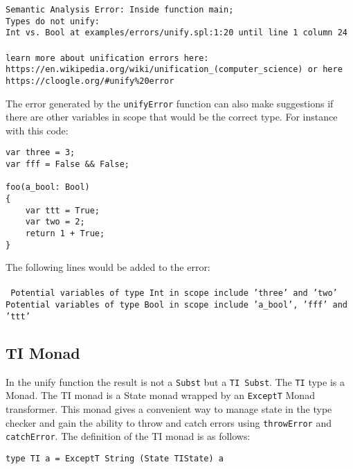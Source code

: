 \documentclass{report}
\begin{document}
\noindent\texttt{\textcolor{error}{Semantic Analysis Error:} Inside function \textcolor{name}{main};\\
Types do not unify:\\
\textcolor{type}{Int} vs. \textcolor{type}{Bool} at \textcolor{filename}{examples/errors/unify.spl:1:20} until line 1 column 24\\
\\
learn more about unification errors here:\\ https://en.wikipedia.org/wiki/unification\_(computer\_science) or here https://cloogle.org/\#unify\%20error}

\pagebreak

\noindent The error generated by the \texttt{unifyError} function can also make suggestions if there are other variables in scope that would be the correct type. For instance with this code:

\begin{lstlisting}[style=SPL]
var three = 3;
var fff = False && False;

foo(a_bool: Bool)
{ 
    var ttt = True;
    var two = 2;
    return 1 + True; 
}
\end{lstlisting}

\noindent The following lines would be added to the error:
\\\\
\noindent \texttt{
Potential variables of type \textcolor{type}{Int} in scope include '\textcolor{name}{three}' and '\textcolor{name}{two}'\\
Potential variables of type \textcolor{type}{Bool} in scope include '\textcolor{name}{a\_bool}', '\textcolor{name}{fff}' and '\textcolor{name}{ttt}'
}

\subsection{TI Monad}

In the unify function the result is not a \texttt{Subst} but a \texttt{TI Subst}. The \texttt{TI} type is a Monad. 
The TI monad is a State monad wrapped by an \texttt{ExceptT} Monad transformer. 
This monad gives a convenient way to manage state in the type checker and gain the ability to throw and catch errors using \texttt{throwError} and \texttt{catchError}. The definition of the TI monad is as follows:

\begin{verbatim}
type TI a = ExceptT String (State TIState) a
\end{verbatim}
\end{document}
